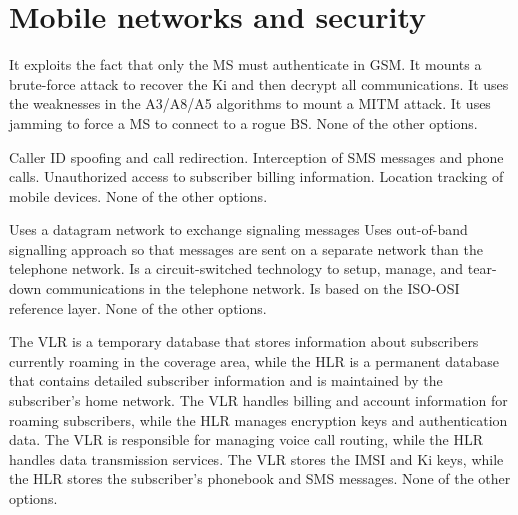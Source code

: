 \section{Mobile networks and security}

\begin{checkboxes}
    \CorrectChoice It exploits the fact that only the MS must authenticate in GSM.
    \choice It mounts a brute-force attack to recover the Ki and then decrypt all communications.
    \choice It uses the weaknesses in the A3/A8/A5 algorithms to mount a MITM attack.
    \choice It uses jamming to force a MS to connect to a rogue BS.
    \choice None of the other options.
\end{checkboxes}


\begin{checkboxes}
    \CorrectChoice Caller ID spoofing and call redirection.
    \CorrectChoice Interception of SMS messages and phone calls.
    \choice Unauthorized access to subscriber billing information.
    \choice Location tracking of mobile devices.
    \choice None of the other options.
\end{checkboxes}

\begin{checkboxes}
    \CorrectChoice Uses a datagram network to exchange signaling messages
    \CorrectChoice Uses out-of-band signalling approach so that messages are sent on a separate network than the telephone network.
    \choice Is a circuit-switched technology to setup, manage, and tear-down communications in the telephone network.
    \choice Is based on the ISO-OSI reference layer.
    \choice None of the other options.
\end{checkboxes}


\begin{checkboxes}
    \CorrectChoice The VLR is a temporary database that stores information about subscribers currently roaming in the coverage area, while the HLR is a permanent database that contains detailed subscriber information and is maintained by the subscriber's home network.
    \choice The VLR handles billing and account information for roaming subscribers, while the HLR manages encryption keys and authentication data.
    \choice The VLR is responsible for managing voice call routing, while the HLR handles data transmission services.
    \choice The VLR stores the IMSI and Ki keys, while the HLR stores the subscriber's phonebook and SMS messages.
    \choice None of the other options.
\end{checkboxes}



